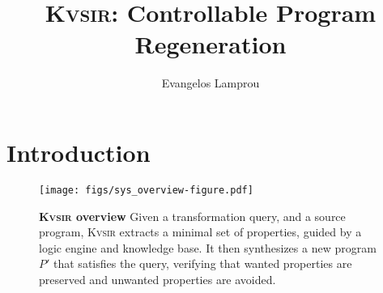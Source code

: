 \documentclass[sigplan]{acmart}
\newcommand{\sys}{{\scshape Kv{\textalpha}sir}\xspace}
\begin{document}
\title{\sys: Controllable Program Regeneration}
\author{Evangelos Lamprou}




\begin{abstract}
\end{abstract}
\maketitle

\section{Introduction}
\begin{figure}[t]
  \texttt{[image: figs/sys\_overview-figure.pdf]}
  \caption{\textbf{\sys overview}
Given a transformation query, and a source program, \sys extracts a minimal set
  of properties,
  guided by a logic engine and knowledge base.
  It then synthesizes a new program $P'$ that satisfies the query, verifying
  that wanted properties are preserved and unwanted properties are avoided.
}
\end{figure}


\end{document}
